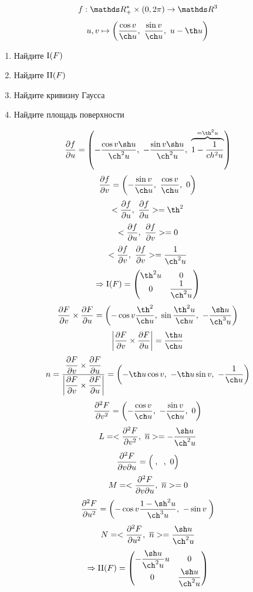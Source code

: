 \documentclass[main]{subfiles}
\begin{document}

    \begin{Example}
      \[f: \R_+^* \times (0, 2\pi) \ra \R^3\]
      \[u,v \mapsto \Br{\dfrac{\cos v}{\ch u},\ \dfrac{\sin v}{\ch u},\ u - \th u}\]
      \begin{enumerate}
        \item Найдите $\RNumb{1}(F)$
        \item Найдите $\RNumb{2}(F)$
        \item Найдите кривизну Гаусса
        \item Найдите площадь поверхности
      \end{enumerate}
    \end{Example}

    \begin{Sol}
      \[\dfrac{\d f}{\d u} = \Br{-\dfrac{\cos v \sh u}{\ch^2 u},\ -\dfrac{\sin v \sh u}{\ch^2 u},\ \ob{= \th^2 u}{1 - \dfrac{1}{ch^2 u}}}\]
      \[\dfrac{\d f}{\d v} = \Br{-\dfrac{\sin v}{\ch u},\ \dfrac{\cos v}{\ch u},\ 0}\]
      \[<\dfrac{\d f}{\d u},\ \dfrac{\d f}{\d u}> = \th^2\]
      \[<\dfrac{\partial f}{\partial u},\ \dfrac{\partial f}{\partial v}> = 0\]
      \[<\dfrac{\d f}{\d v},\ \dfrac{\d f}{\d v}> = \dfrac{1}{\ch^2 u}\]
      \[\Ra \RNumb{1}(F) = \begin{pmatrix}
        {}\th^2 u & 0\\
        0 & \dfrac{1}{\ch^2 u}
      \end{pmatrix}\]
      \[\frac{\d F}{\d v} \times \frac{\d F}{\d u} =
      \Br{
        -\cos v \dfrac{\th^2}{\ch u},\
        \sin \dfrac{\th^2 u}{\ch u},\
        -\dfrac{\sh u}{\ch^3 u}
      }\]
      \[\abs{\dfrac{\d F}{\d v} \times \dfrac{\d F}{\d u}} = \dfrac{\th u}{\ch u}\]
      \[n =
      \dfrac{
        \dfrac{\d F}{\d v} \times \dfrac{\d F}{\d u}
      }{
        \abs{\dfrac{\d F}{\d v} \times \dfrac{\d F}{\d u}}
      } = \Br{- \th u \cos v,\ -\th u \sin v,\ -\dfrac{1}{\ch u}}\]
      \[\frac{\d^2 F}{\d v^2} = \Br{-\dfrac{\cos v}{\ch u},\ -\dfrac{\sin v}{\ch u},\ 0}\]
      \[L = <\frac{\d^2 F}{\d v^2},\ \ol{n}> = -\dfrac{\sh u}{\ch^2 u}\]
      \[\frac{\partial^2 F}{\partial v \partial u} = \left(\dfrac{}{},\ \dfrac{}{},\ 0\right)\]
      \[M = <\frac{\partial^2 F}{\partial v \partial u},\ \overline{n}> = 0\]
      \[\frac{\d^2 F}{\d u^2} = \Br{-\cos v \dfrac{1-\sh^2 u}{\ch^3 u},\ -\sin v \dfrac{}{}}\]
      \[N = <\frac{\d^2 F}{\d u^2},\ \ol{n}> = \dfrac{\sh u}{\ch^2 u}\]
      \[\Ra \RNumb{2}(F) = \begin{pmatrix}
        -\dfrac{\sh u}{\ch^2 u} u & 0\\
        0 & \dfrac{\sh u}{\ch^2 u}
      \end{pmatrix}\]


\end{Sol}
\end{document}
